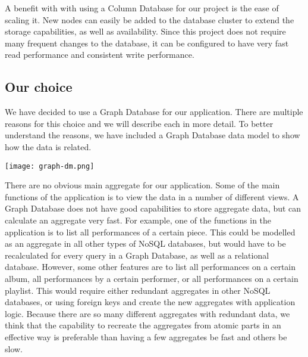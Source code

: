 A benefit with with using a Column Database for our project is the ease of scaling it. New nodes can easily be added to the database cluster to extend the storage capabilities, as well as availability. Since this project does not require many frequent changes to the database, it can be configured to have very fast read performance and consistent write performance.

\subsection{Our choice}
We have decided to use a Graph Database for our application. There are multiple reasons for this
choice and we will describe each in more detail. To better understand the reasons, we have
included a Graph Database data model to show how the data is related.

\texttt{[image: graph-dm.png]}

There are no obvious main aggregate for our application. Some of the main functions of the
application is to view the data in a number of different views. A Graph Database does not have good
capabilities to store aggregate data, but can calculate an aggregate very fast. For example, one of
the functions in the application is to list all performances of a certain piece. This could be
modelled as an aggregate in all other types of NoSQL databases, but would have to be recalculated
for every query in a Graph Database, as well as a relational database. However, some other features
are to list all performances on a certain album, all performances by a certain performer, or all
performances on a certain playlist. This would require either redundant aggregates in other NoSQL
databases, or using foreign keys and create the new aggregates with application logic. Because there
are so many different aggregates with redundant data, we think that the capability to recreate the
aggregates from atomic parts in an effective way is preferable than having a few aggregates be fast
and others be slow.

